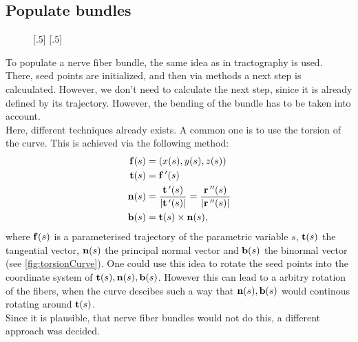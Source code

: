 \subsection{Populate bundles}\label{sec:fillBundle}
% 
\begin{figure}[!t]
    \centering
    [.5\textwidth-4.3pt]{
    \setlength{\tikzwidth}{0.5\textwidth - 4.3pt}
    }\hfill
    [.5\textwidth-4.3pt]{
    }
	\caption{}
\end{figure}
% 
To populate a nerve fiber bundle, the same idea as in tractography is used.
There, seed points are initialized, and then via \dummy methods a next step is calcuulated.
However, we don't need to calculate the next step, sinice it is already defined by its trajectory.
However, the bending of the bundle has to be taken into account.\\
% 
Here, different techniques already exists.
A common one is to use the torsion of the curve. This is achieved via the following method:
% 
\begin{align}
\begin{split}
\mathbf{f}(s) &= (x(s),y(s),z(s)) \\
\mathbf{t}(s) &= \mathbf{f}\,'(s) \\
\mathbf{n}(s) &= \frac{\mathbf{t}\,'(s)}{|\mathbf{t}\,'(s)|} = \frac{\mathbf{r}\,''(s)}{|\mathbf{r}\,''(s)|} \\
\mathbf{b}(s) &= \mathbf{t}(s) \times \mathbf{n}(s),
\end{split}
\end{align}
% 
where $\mathbf{f}(s)$ is a parameterised trajectory of the parametric variable $s$, $\mathbf{t}(s)$ the tangential vector, $\mathbf{n}(s)$ the principal normal vector and $\mathbf{b}(s)$ the binormal vector (see \cref{fig:torsionCurve}).
One could use this idea to rotate the seed points into the coordinate system of $\mathbf{t}(s),\mathbf{n}(s),\mathbf{b}(s)$.
However this can lead to a arbitry rotation of the fibers, \eg when the curve descibes such a way that $\mathbf{n}(s),\mathbf{b}(s)$ would continous rotating around $\mathbf{t}(s)$.
\\
% 
Since it is plausible, that nerve fiber bundles would not do this, a different approach was decided.
